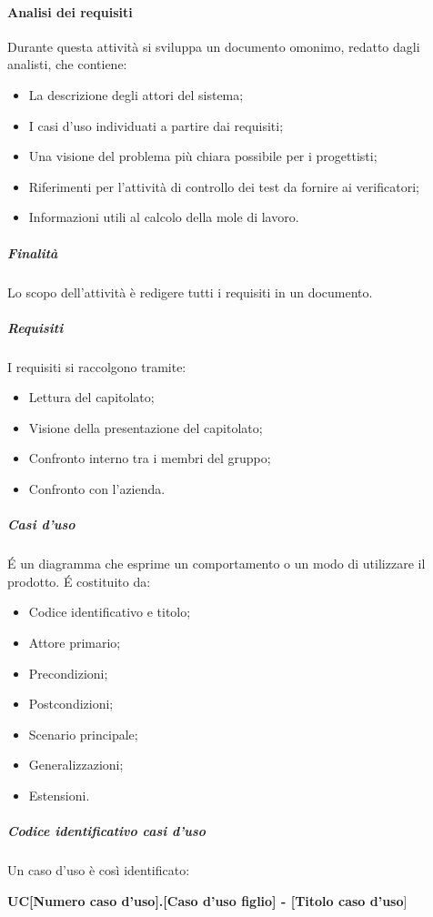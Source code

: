 \paragraph{Analisi dei requisiti}
Durante questa attività si sviluppa un documento omonimo, redatto dagli analisti, che contiene:
\begin{itemize}
\item La descrizione degli attori del sistema;
\item I casi d'uso individuati a partire dai requisiti;
\item Una visione del problema più chiara possibile per i progettisti;
\item Riferimenti per l'attività di controllo dei test da fornire ai verificatori;
\item Informazioni utili al calcolo della mole di lavoro.
\end{itemize}
\subparagraph{Finalità}
Lo scopo dell'attività è redigere tutti i requisiti in un documento.
\subparagraph{Requisiti}
I requisiti si raccolgono tramite:
\begin{itemize}
\item Lettura del capitolato;
\item Visione della presentazione del capitolato;
\item Confronto interno tra i membri del gruppo;
\item Confronto con l'azienda.
\end{itemize}
\subparagraph{Casi d'uso}
\'E un diagramma che esprime un comportamento o un modo di utilizzare il prodotto. \'E costituito da:
\begin{itemize}
\item Codice identificativo e titolo;
\item Attore primario;
\item Precondizioni;
\item Postcondizioni;
\item Scenario principale;
\item Generalizzazioni;
\item Estensioni.
\end{itemize}
\subparagraph{Codice identificativo casi d'uso}
Un caso d'uso è così identificato:

\begin{center}
\textbf{UC[Numero caso d'uso].[Caso d'uso figlio] - [Titolo caso d'uso}]
\end{center}
		
